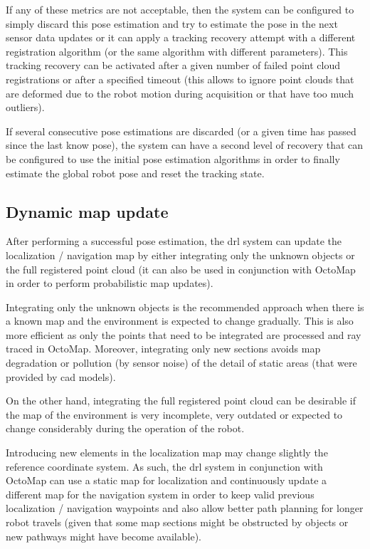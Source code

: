 If any of these metrics are not acceptable, then the system can be configured to simply discard this pose estimation and try to estimate the pose in the next sensor data updates or it can apply a tracking recovery attempt with a different registration algorithm (or the same algorithm with different parameters). This tracking recovery can be activated after a given number of failed point cloud registrations or after a specified timeout (this allows to ignore point clouds that are deformed due to the robot motion during acquisition or that have too much outliers).

If several consecutive pose estimations are discarded (or a given time has passed since the last know pose), the system can have a second level of recovery that can be configured to use the initial pose estimation algorithms in order to finally estimate the global robot pose and reset the tracking state.


\subsection{Dynamic map update}

After performing a successful pose estimation, the \gls{drl} system can update the localization / navigation map by either integrating only the unknown objects or the full registered point cloud (it can also be used in conjunction with OctoMap \cite{Hornung2013} in order to perform probabilistic map updates).

Integrating only the unknown objects is the recommended approach when there is a known map and the environment is expected to change gradually. This is also more efficient as only the points that need to be integrated are processed and ray traced in OctoMap. Moreover, integrating only new sections avoids map degradation or pollution (by sensor noise) of the detail of static areas (that were provided by \gls{cad} models).

On the other hand, integrating the full registered point cloud can be desirable if the map of the environment is very incomplete, very outdated or expected to change considerably during the operation of the robot.

Introducing new elements in the localization map may change slightly the reference coordinate system. As such, the \gls{drl} system in conjunction with OctoMap can use a static map for localization and continuously update a different map for the navigation system in order to keep valid previous localization / navigation waypoints and also allow better path planning for longer robot travels (given that some map sections might be obstructed by objects or new pathways might have become available).

